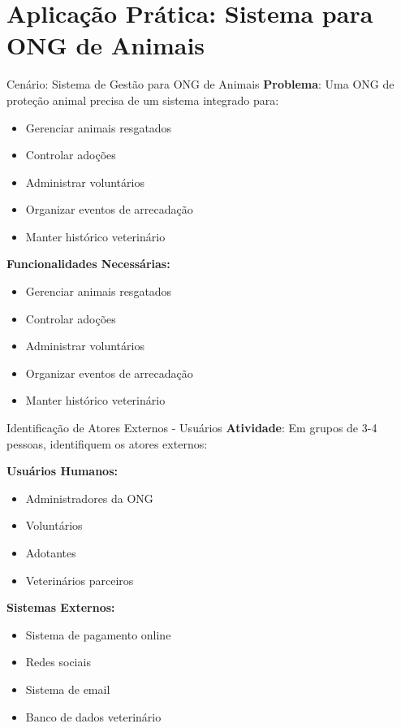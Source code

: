 \documentclass[aspectratio=169]{beamer}
\begin{document}
\section{Aplicação Prática: Sistema para ONG de Animais}

\begin{frame}{Cenário: Sistema de Gestão para ONG de Animais}
\textbf{Problema}: Uma ONG de proteção animal precisa de um sistema integrado para:
\begin{itemize}
\item Gerenciar animais resgatados
\item Controlar adoções
\item Administrar voluntários
\item Organizar eventos de arrecadação
\item Manter histórico veterinário
\end{itemize}

\vspace{0.5cm}
\textbf{Funcionalidades Necessárias:}
\begin{itemize}
\item Gerenciar animais resgatados
\item Controlar adoções
\item Administrar voluntários
\item Organizar eventos de arrecadação
\item Manter histórico veterinário
\end{itemize}
\end{frame}

\begin{frame}{Identificação de Atores Externos - Usuários}
\textbf{Atividade}: Em grupos de 3-4 pessoas, identifiquem os atores externos:

\textbf{Usuários Humanos:}
\begin{itemize}
\item Administradores da ONG
\item Voluntários
\item Adotantes
\item Veterinários parceiros
\end{itemize}

\vspace{0.5cm}
\textbf{Sistemas Externos:}
\begin{itemize}
\item Sistema de pagamento online
\item Redes sociais
\item Sistema de email
\item Banco de dados veterinário
\end{itemize}
\end{frame}
\end{document}
